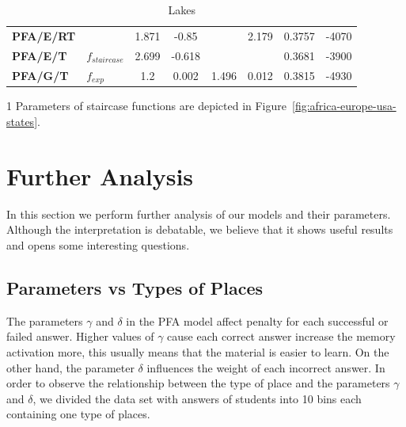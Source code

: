 \begin{table}
\begin{threeparttable}
\begin{subtable}{\linewidth}
\begin{tabular}{ p{2cm} l
                       S[table-format=1.3] S[table-format=1.3]
                       S[table-format=1.3] S[table-format=1.3]
                       S[table-format=1.4] S[table-format=5] }
       \textbf{PFA/E/RT} & & 1.871 & -0.85  &       & 2.179 & 0.3757 & -4070 \\
       \textbf{PFA/E/T}  & $f_{\mathit{staircase}}$
          & 2.699 & -0.618 &       &       & 0.3681 & -3900 \\
       \textbf{PFA/G/T}  & $f_{\mathit{exp}}$
          & 1.2   &  0.002 & 1.496 & 0.012 & 0.3815 & -4930 \\
       \bottomrule[\heavyrulewidth]
       \bottomrule[\heavyrulewidth]
      \end{tabular}
      \caption{Lakes}
      \label{table:results-lakes}
    \end{subtable}
    \begin{tablenotes}
      \item[1] Parameters of staircase functions are depicted in Figure~\ref{fig:africa-europe-usa-states}.
    \end{tablenotes}
  \end{threeparttable}
  \label{table:results-nature}
\end{table}

\section{Further Analysis}
\label{further-analysis}

In this section we perform further analysis of our models and their parameters. Although the interpretation is debatable, we believe that it shows useful results and opens some interesting questions.

\subsection{Parameters vs Types of Places}

The parameters $\gamma$ and $\delta$ in the PFA model affect penalty for each successful or failed answer. Higher values of $\gamma$ cause each correct answer increase the memory activation more, this usually means that the material is easier to learn. On the other hand, the parameter $\delta$ influences the weight of each incorrect answer. In order to observe the relationship between the type of place and the parameters $\gamma$ and $\delta$, we divided the data set with answers of students into 10 bins each containing one type of places.

